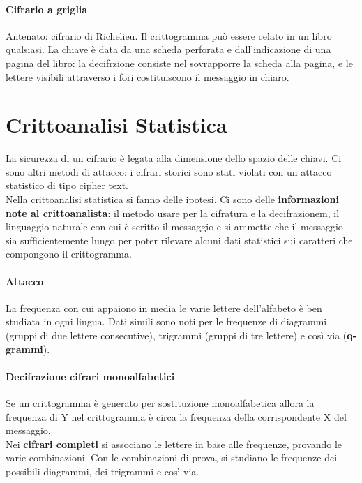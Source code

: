 \documentclass[10pt]{book}
\begin{document}
\paragraph{Cifrario a griglia} Antenato: cifrario di Richelieu. Il crittogramma può essere celato in un libro qualsiasi. La chiave è data da una scheda perforata e dall'indicazione di una pagina del libro: la decifrzione consiste nel sovrapporre la scheda alla pagina, e le lettere visibili attraverso i fori costituiscono il messaggio in chiaro.
\section{Crittoanalisi Statistica} La sicurezza di un cifrario è legata alla dimensione dello spazio delle chiavi. Ci sono altri metodi di attacco: i cifrari storici sono stati violati con un attacco statistico di tipo cipher text.\\
Nella crittoanalisi statistica si fanno delle ipotesi. Ci sono delle \textbf{informazioni note al crittoanalista}: il metodo usare per la cifratura e la decifrazionem, il linguaggio naturale con cui è scritto il messaggio e si ammette che il messaggio sia sufficientemente lungo per poter rilevare alcuni dati statistici sui caratteri che compongono il crittogramma.
\paragraph{Attacco} La frequenza con cui appaiono in media le varie lettere dell'alfabeto è ben studiata in ogni lingua. Dati simili sono noti per le frequenze di diagrammi (gruppi di due lettere consecutive), trigrammi (gruppi di tre lettere) e così via (\textbf{q-grammi}).
\paragraph{Decifrazione cifrari monoalfabetici}
Se un crittogramma è generato per sostituzione monoalfabetica allora la frequenza di Y nel crittogramma è circa la frequenza della corrispondente X del messaggio.\\
Nei \textbf{cifrari completi} si associano le lettere in base alle frequenze, provando le varie combinazioni. Con le combinazioni di prova, si studiano le frequenze dei possibili diagrammi, dei trigrammi e così via.
\end{document}
